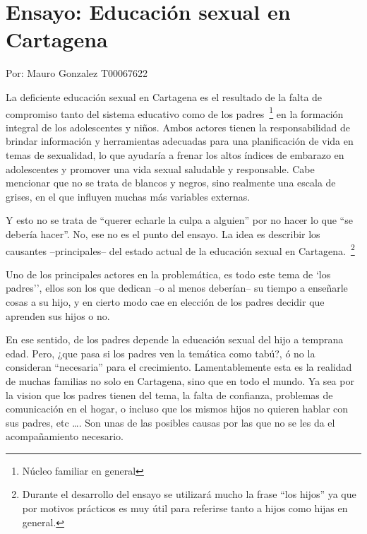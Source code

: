 \documentclass[letterpaper, 12pt]{article}
\begin{document}
\section*{Ensayo: Educación sexual en Cartagena}

\noindent\makebox[\linewidth]{\rule{\textwidth}{0.4pt}}

Por: Mauro Gonzalez T00067622

\noindent\makebox[\linewidth]{\rule{\textwidth}{0.4pt}}

\bigskip

La deficiente educación sexual en Cartagena es el resultado
de la falta de compromiso tanto del sistema educativo como
de los padres~\footnote{Núcleo familiar en general} en la formación integral de los
adolescentes y niños. Ambos actores tienen la
responsabilidad de brindar información y herramientas
adecuadas para una planificación de vida en temas de
sexualidad, lo que ayudaría a frenar los altos índices de
embarazo en adolescentes y promover una vida sexual
saludable y responsable. Cabe mencionar que no se trata de
blancos y negros, sino realmente una escala de grises, en
el que influyen muchas más variables externas.

Y esto no se trata de ``querer echarle la culpa a alguien''
por no hacer lo que ``se debería hacer''. No, ese no es el
punto del ensayo. La idea es describir los causantes
--principales-- del estado actual de la educación sexual en
Cartagena.~\footnote{Durante el desarrollo del ensayo se
    utilizará mucho la frase ``los hijos'' ya que por motivos
    prácticos es muy útil para referirse tanto a hijos como
    hijas en general.}


Uno de los principales actores en la problemática, es todo
este tema de `los padres'', ellos son los que dedican --o
al menos deberían-- su tiempo a enseñarle cosas a su hijo,
y en cierto modo cae en elección de los padres decidir que
aprenden sus hijos o no.

En ese sentido, de los padres depende la educación sexual
del hijo a temprana edad. Pero, ¿que pasa si los padres ven
la temática como tabú?, ó no la consideran ``necesaria''
para el crecimiento. Lamentablemente esta es la realidad de
muchas familias no solo en Cartagena, sino que en todo el
mundo. Ya sea por la vision que los padres tienen del tema,
la falta de confianza, problemas de comunicación en el
hogar, o incluso que los mismos hijos no quieren hablar con
sus padres, etc \dots. Son unas de las posibles causas por
las que no se les da el acompañamiento necesario.
\end{document}
